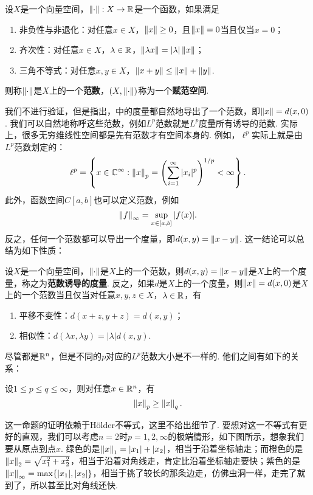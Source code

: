 \begin{definition}[范数，赋范空间]
设$X$是一个向量空间，$\left\|\cdot\right\|:X\to\mathbb{R}$是一个函数，如果满足
\begin{enumerate}
    \item 非负性与非退化：对任意$x\in X$，$\left\|x\right\|\geq 0$，且$\left\|x\right\|=0$当且仅当$x=0$；
    \item 齐次性：对任意$x\in X$，$\lambda\in\mathbb{R}$，$\left\|\lambda x\right\|=|\lambda|\left\|x\right\|$；
    \item 三角不等式：对任意$x,y\in X$，$\left\|x+y\right\|\leq \left\|x\right\|+\left\|y\right\|$. 
\end{enumerate}
则称$\left\|\cdot\right\|$是$X$上的一个\textbf{范数}，$(X,\left\|\cdot\right\|)$称为一个\textbf{赋范空间}. 
\end{definition}
我们不进行验证，但是指出，中的度量都自然地导出了一个范数，即$\left\|x\right\|=d(x,0)$. 我们可以自然地称呼这些范数，例如$L^p$范数就是$L^p$度量所有诱导的范数. 实际上，很多无穷维线性空间都是先有范数才有空间本身的. 例如，$\ell^p$实际上就是由$L^p$范数划定的：
\[ \ell^p=\left\{x\in\mathbb{C}^\infty:\left\|x\right\|_p=\left(\sum_{i=1}^\infty|x_i|^p\right)^{1/p}<\infty\right\}. \]
此外，函数空间$C[a,b]$也可以定义范数，例如
\[ \left\|f\right\|_\infty=\sup_{x\in[a,b]}|f(x)|. \]
反之，任何一个范数都可以导出一个度量，即$d(x,y)=\left\|x-y\right\|$. 这一结论可以总结为如下性质：

\begin{proposition}\label{prop:metric-norm}
    设$X$是一个向量空间，$\left\|\cdot\right\|$是$X$上的一个范数，则$d(x,y)=\left\|x-y\right\|$是$X$上的一个度量，称之为\textbf{范数诱导的度量}. 反之，如果$d$是$X$上的一个度量，则$\left\|x\right\|=d(x,0)$是$X$上的一个范数当且仅当对任意$x,y,z\in X$，$\lambda\in\mathbb{R}$，有
    \begin{enumerate}
        \item 平移不变性：$d(x+z,y+z)=d(x,y)$；
        \item 相似性：$d(\lambda x,\lambda y)=|\lambda|d(x,y)$.
    \end{enumerate}
\end{proposition}

尽管都是$\mathbb{R}^n$，但是不同的$p$对应的$L^p$范数大小是不一样的. 他们之间有如下的关系：

\begin{proposition}\label{prop:lp-norm}
    设$1\leq p\leq q\leq \infty$，则对任意$x\in\mathbb{R}^n$，有
    \[\left\|x\right\|_p\geq \left\|x\right\|_q.\]
\end{proposition}
这一命题的证明依赖于H\"older不等式，这里不给出细节了. 要想对这一不等式有更好的直观，我们可以考虑$n=2$时$p=1,2,\infty$的极端情形，如下图所示，想象我们要从原点到点$x$. 绿色的是$\left\|x\right\|_1=|x_1|+|x_2|$，相当于沿着坐标轴走；而橙色的是$\left\|x\right\|_2=\sqrt{x_1^2+x_2^2}$，相当于沿着对角线走，肯定比沿着坐标轴走要快；紫色的是$\left\|x\right\|_\infty=\max\{|x_1|,|x_2|\}$，相当于挑了较长的那条边走，仿佛虫洞一样，走完了就到了，所以甚至比对角线还快. 

